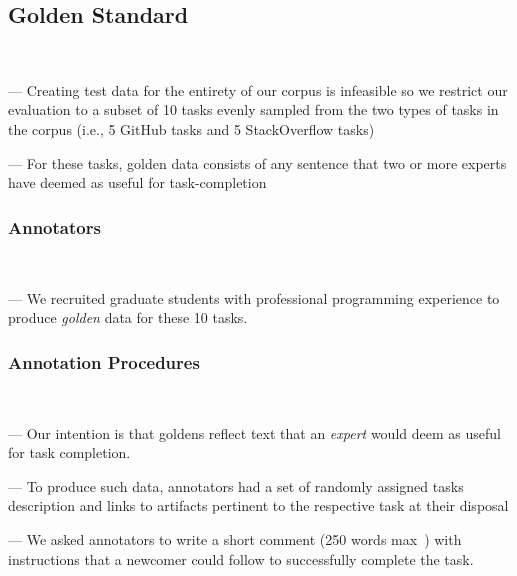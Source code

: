 \subsection{Golden Standard}
\textcolor{white}{force ident} %

--- Creating test data for the entirety of our corpus is infeasible so we restrict our evaluation to a subset of 10 tasks evenly sampled from the two types of tasks in the corpus (i.e., 5 GitHub tasks and 5 StackOverflow tasks) \vspace{3mm}

--- For these tasks, golden data consists of any sentence that two or more experts have deemed as useful for task-completion \vspace{3mm}



\subsubsection{Annotators}
\textcolor{white}{force ident} %

--- We recruited  graduate students with professional programming experience to produce \textit{golden} data for these 10 tasks. \vspace{3mm}


\subsubsection{Annotation Procedures}
\textcolor{white}{force ident} %

--- Our intention is that goldens reflect text that an \textit{expert} would deem as useful for task completion. \vspace{3mm}



--- To produce such data, annotators had a set of randomly assigned tasks description and links to artifacts 
pertinent to the respective task at their disposal \vspace{3mm}

--- We asked annotators to write a short comment (250 words max~\cite{Rastkar2010}) with instructions that a newcomer could follow to successfully complete the task.


